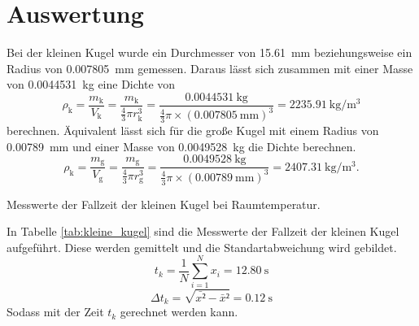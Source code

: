 \section{Auswertung}
\label{sec:Auswertung}
\newcommand{\kleineKugelDurchmesser}{\SI{15.61}{\milli\meter} }
\newcommand{\kleineKugelRadius}{\SI{0.007805}{\milli\meter} }
\newcommand{\kleineKugelMasse}{\SI{0.0044531}{\kilo\gram} }
\newcommand{\kleineKugelDichte}{\SI{2235.91}{\kilo\gram\per\cubic\meter} }

\newcommand{\grosseKugelRadius}{\SI{0.00789}{\milli\meter} }
\newcommand{\grosseKugelDurchmesser}{\SI{0.01578}{\milli\meter} }
\newcommand{\grosseKugelMasse}{\SI{0.0049528}{\kilo\gram} }
\newcommand{\grosseKugelDichte}{\SI{2407.31}{\kilo\gram\per\cubic\meter} }

Bei der kleinen Kugel wurde ein Durchmesser von \kleineKugelDurchmesser beziehungsweise ein Radius von \kleineKugelRadius gemessen.
Daraus lässt sich zusammen mit einer Masse von \kleineKugelMasse eine Dichte von
\begin{equation*}
  \rho_\text{k}
  = \frac{m_\text{k}}{V_\text{k}}
  = \frac{m_\text{k}}{\frac{4}{3}\pi r_\text{k}^3}
  = \frac{\kleineKugelMasse}{\frac{4}{3}\pi\times(\kleineKugelRadius)^3}
  = \kleineKugelDichte
\end{equation*}
berechnen.
Äquivalent lässt sich für die große Kugel mit einem Radius von \grosseKugelRadius und einer Masse von \grosseKugelMasse die Dichte berechnen.
\begin{equation*}
  \rho_\text{k}
  = \frac{m_\text{g}}{V_\text{g}}
  = \frac{m_\text{g}}{\frac{4}{3}\pi r_\text{g}^3}
  = \frac{\grosseKugelMasse}{\frac{4}{3}\pi\times(\grosseKugelRadius)^3}
  = \grosseKugelDichte.
\end{equation*}

\begin{table}
  \centering
  
  \caption{Messwerte der Fallzeit der kleinen Kugel bei Raumtemperatur.}
  \label{tab:kleine_kugel}
\end{table}

\noindent In Tabelle \autoref{tab:kleine_kugel} sind die Messwerte der Fallzeit der kleinen Kugel aufgeführt.
Diese werden gemittelt und die Standartabweichung wird gebildet.
\begin{equation*}
  t_{k} = \frac{1}{N} \sum_{i=1}^{N}x_i =  \SI{12.80}{\second}
\end{equation*}
\begin{equation*}
  \Delta t_{k} = \sqrt{\bar{x²}-\bar{x}²} = \SI{0.12}{\second}
\end{equation*}
Sodass mit der Zeit $t_{k}$ gerechnet werden kann.

